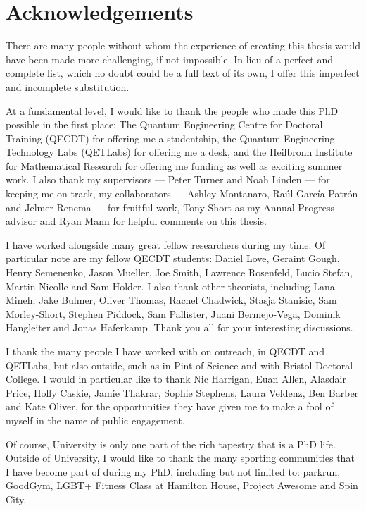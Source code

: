 \chapter*{Acknowledgements}

There are many people without whom the experience of creating this thesis would have been made more challenging, if not impossible. In lieu of a perfect and complete list, which no doubt could be a full text of its own, I offer this imperfect and incomplete substitution.

At a fundamental level, I would like to thank the people who made this PhD possible in the first place: The Quantum Engineering Centre for Doctoral Training (QECDT) for offering me a studentship, the Quantum Engineering Technology Labs (QETLabs) for offering me a desk, and the Heilbronn Institute for Mathematical Research for offering me funding as well as exciting summer work. I also thank my supervisors --- Peter Turner and Noah Linden --- for keeping me on track, my collaborators --- Ashley Montanaro, Ra\'{u}l Garc\'{i}a-Patr\'{o}n and Jelmer Renema --- for fruitful work, Tony Short as my Annual Progress advisor and Ryan Mann for helpful comments on this thesis.

I have worked alongside many great fellow researchers during my time. Of particular note are my fellow QECDT students: Daniel Love, Geraint Gough, Henry Semenenko, Jason Mueller, Joe Smith, Lawrence Rosenfeld, Lucio Stefan, Martin Nicolle and Sam Holder. I also thank other theorists, including Lana Mineh, Jake Bulmer, Oliver Thomas, Rachel Chadwick, Stasja Stanisic, Sam Morley-Short, Stephen Piddock, Sam Pallister, Juani Bermejo-Vega, Dominik Hangleiter and Jonas Haferkamp. Thank you all for your interesting discussions.

I thank the many people I have worked with on outreach, in QECDT and QETLabs, but also outside, such as in Pint of Science and with Bristol Doctoral College. I would in particular like to thank Nic Harrigan, Euan Allen, Alasdair Price, Holly Caskie, Jamie Thakrar, Sophie Stephens, Laura Veldenz, Ben Barber and Kate Oliver, for the opportunities they have given me to make a fool of myself in the name of public engagement.

Of course, University is only one part of the rich tapestry that is a PhD life. Outside of University, I would like to thank the many sporting communities that I have become part of during my PhD, including but not limited to: parkrun, GoodGym, LGBT+ Fitness Class at Hamilton House, Project Awesome and Spin City.

